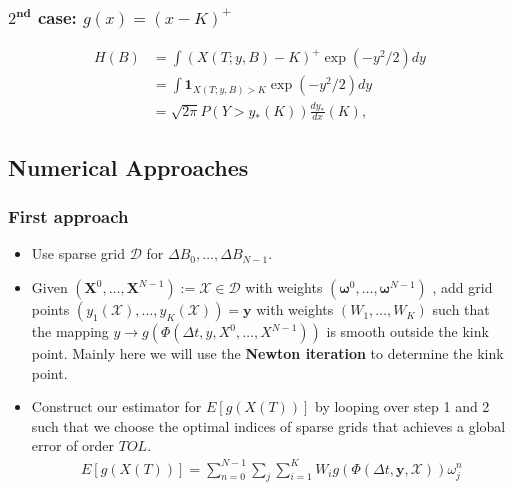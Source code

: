 \documentclass[11pt]{article}
\begin{document}
\subsubsection{$2^{\textbf{nd}}$ case: $g(x)=(x-K)^{+}$}
\begin{align}\label{smoothed_integrand_delta}
	H(B)&= \int (X(T;y,B)-K)^+ \operatorname{exp}(-y^2/2) dy \nonumber\\
	&= \int \mathbf{1}_{X(T;y,B)>K} \operatorname{exp}(-y^2/2) dy \nonumber\\
	&= \sqrt{2 \pi} P(Y>y_{\ast}(K)) \frac{d y_{\ast}}{dx}(K),
	\end{align}
\subsection{Numerical Approaches}
\subsubsection{First approach}
\begin{itemize}
	\item Use sparse grid $\mathcal{D}$ for $\Delta B_0, \dots, \Delta B_{N-1}$.
	\item Given $(\mathbf{X}^0,\dots, \mathbf{X}^{N-1}):=\mathcal{X} \in \mathcal{D}$ with weights $(\boldsymbol{\omega}^0,\dots,\boldsymbol{\omega}^{N-1})$ , add grid points $(y_1(\mathcal{X}),\dots,y_K(\mathcal{X}))=\mathbf{y}$ with weights $(W_1,\dots, W_K)$ such that the mapping $y \rightarrow g(\Phi(\Delta t, y, X^0,\dots, X^{N-1}))$ is smooth outside the kink point. Mainly here we will use the \textbf{Newton iteration}  to determine the kink point.
	\item Construct our estimator for $E[g(X(T))]$ by looping over step 1 and 2 such that we choose the optimal indices of sparse grids that achieves a global error of order $TOL$.
	\begin{align*}
	E[g(X(T))]=\sum_{n=0}^{N-1}\sum_{j} \sum_{i=1}^K W_i g(\Phi(\Delta t,\mathbf{y},\mathcal{X})) \omega_{j}^n 
	\end{align*} 
\end{itemize}
\end{document}
